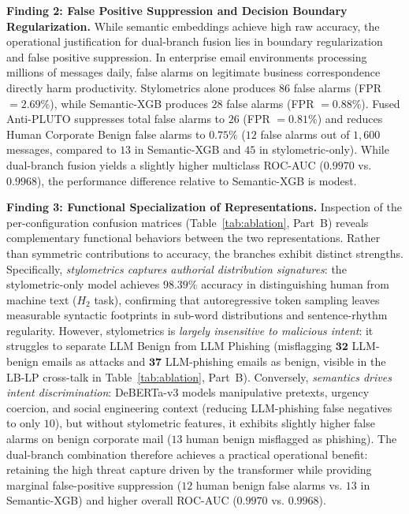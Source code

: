 \documentclass[journal]{IEEEtran}
\begin{document}
\textbf{Finding 2: False Positive Suppression and Decision Boundary Regularization.} While semantic embeddings achieve high raw accuracy, the operational justification for dual-branch fusion lies in boundary regularization and false positive suppression. In enterprise email environments processing millions of messages daily, false alarms on legitimate business correspondence directly harm productivity. Stylometrics alone produces $86$ false alarms (FPR $= 2.69\%$), while Semantic-XGB produces $28$ false alarms (FPR $= 0.88\%$). Fused Anti-PLUTO suppresses total false alarms to $26$ (FPR $= 0.81\%$) and reduces Human Corporate Benign false alarms to $0.75\%$ ($12$ false alarms out of $1,600$ messages, compared to $13$ in Semantic-XGB and $45$ in stylometric-only). While dual-branch fusion yields a slightly higher multiclass ROC-AUC ($0.9970$ vs. $0.9968$), the performance difference relative to Semantic-XGB is modest.

\textbf{Finding 3: Functional Specialization of Representations.} Inspection of the per-configuration confusion matrices (Table~\ref{tab:ablation}, Part~B) reveals complementary functional behaviors between the two representations. Rather than symmetric contributions to accuracy, the branches exhibit distinct strengths. Specifically, \emph{stylometrics captures authorial distribution signatures}: the stylometric-only model achieves $98.39\%$ accuracy in distinguishing human from machine text ($H_2$ task), confirming that autoregressive token sampling leaves measurable syntactic footprints in sub-word distributions and sentence-rhythm regularity. However, stylometrics is \emph{largely insensitive to malicious intent}: it struggles to separate LLM Benign from LLM Phishing (misflagging $\mathbf{32}$ LLM-benign emails as attacks and $\mathbf{37}$ LLM-phishing emails as benign, visible in the LB-LP cross-talk in Table~\ref{tab:ablation}, Part~B). Conversely, \emph{semantics drives intent discrimination}: DeBERTa-v3 models manipulative pretexts, urgency coercion, and social engineering context (reducing LLM-phishing false negatives to only $10$), but without stylometric features, it exhibits slightly higher false alarms on benign corporate mail ($13$ human benign misflagged as phishing). The dual-branch combination therefore achieves a practical operational benefit: retaining the high threat capture driven by the transformer while providing marginal false-positive suppression ($12$ human benign false alarms vs. $13$ in Semantic-XGB) and higher overall ROC-AUC ($0.9970$ vs. $0.9968$).
\end{document}
